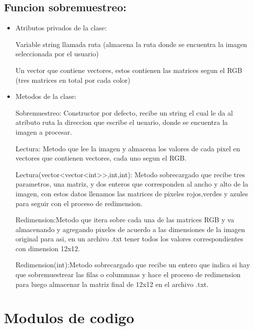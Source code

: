 \documentclass{article}
\begin{document}
\subsection{Funcion sobremuestreo:}
\begin{itemize}
\item Atributos privados de la clase:

\hspace{0.5cm}Variable string llamada ruta (almacena la ruta donde se encuentra la imagen seleccionada por el usuario)

\hspace{0.5cm}Un vector que contiene vectores, estos contienen las matrices segun el RGB (tres matrices en total por cada color)

\item Metodos de la clase:

\hspace{0.5cm}Sobremuestreo: Constructor por defecto, recibe un string el cual le da al atributo ruta la direccion que escribe el usuario, donde se encuentra la imagen a procesar.

\hspace{0.5cm}Lectura: Metodo que lee la imagen y almacena los valores de cada pixel en vectores que contienen vectores, cada uno segun el RGB.

\hspace{1cm}Lectura(vector<vector<int>>,int,int): Metodo sobrecargado que recibe tres parametros, una matriz, y dos enteros que corresponden al ancho y alto de la imagen, con estos datos llenamos las matrices de pixeles rojos,verdes y azules para seguir con el proceso de redimension.

\hspace{0.5cm}Redimension:Metodo que itera sobre cada una de las matrices RGB y va almacenando y agregando pixeles de acuerdo a las dimensiones de la imagen original para asi, en un archivo .txt tener todos los valores correspondientes con dimension 12x12.

\hspace{0.5cm}Redimension(int):Metodo sobrecargado que recibe un entero que indica si hay que sobremuestrear las filas o colummnas y hace el proceso de redimension para luego almacenar la matriz final de 12x12 en el archivo .txt.


\end{itemize}

\section{Modulos de codigo}
\end{document}
